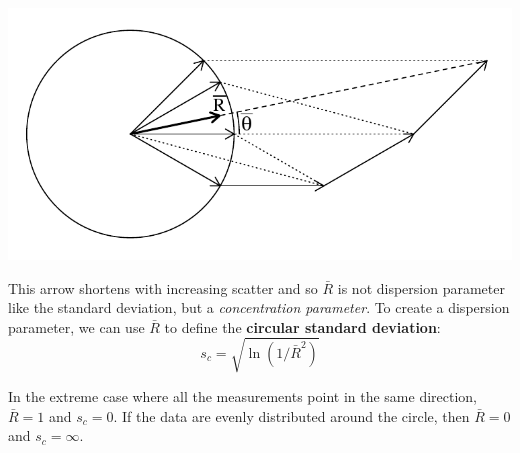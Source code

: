 \noindent\begin{minipage}[t][][b]{.45\textwidth}
\includegraphics[width=\textwidth]{../figures/vectorsum.pdf}\medskip
\end{minipage}
\begin{minipage}[t][][t]{.55\textwidth}
  \label{fig:vectorsum}
\end{minipage}

This arrow shortens with increasing scatter and so $\bar{R}$ is not
dispersion parameter like the standard deviation, but a
\textit{concentration parameter}. To create a dispersion parameter, we
can use $\bar{R}$ to define the \textbf{circular standard deviation}:
\begin{equation}
  s_c = \sqrt{\ln(1/\bar{R}^2)}
  \label{eq:circularSD}
\end{equation}

In the extreme case where all the measurements point in the same
direction, $\bar{R} = 1$ and $s_c = 0$. If the data are evenly
distributed around the circle, then $\bar{R} = 0$ and $s_c = \infty$.

